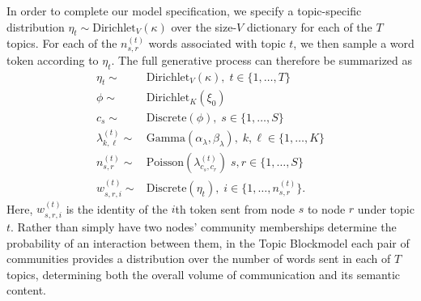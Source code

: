     In order to complete our model specification, we specify a topic-specific distribution $\eta_t \sim \mbox{Dirichlet}_V(\kappa)$ over the size-$V$ dictionary for each of the $T$ topics. For each of the $n_{s,r}^{(t)}$ words associated with topic $t$, we then sample a word token according to $\eta_t$. The full generative process can therefore be summarized as
    \begin{equation}
      \begin{aligned}
        \eta_t \sim& \mbox{Dirichlet}_V(\kappa),\; t\in \{1,\dots,T\}\\
        \phi \sim& \mbox{Dirichlet}_K(\xi_0)\\
        c_s \sim& \mbox{Discrete}(\phi),\; s\in\{1,\dots,S\}\\
        \lambda^{(t)}_{k,\ell}\sim& \mbox{Gamma}(\alpha_\lambda, \beta_\lambda),\; k,\ell \in\{1,\dots, K\}\\
        n_{s,r}^{(t)}\sim& \mbox{Poisson}(\lambda_{c_s,c_r}^{(t)})\; s,r \in\{1,\dots, S\}\\
        w_{s,r,i}^{(t)} \sim& \mbox{Discrete}(\eta_t),\; i\in\{1,\dots, n_{s,r}^{(t)}\}.
      \end{aligned}\label{eqn:PoisForm}
    \end{equation}
    Here, $w_{s,r,i}^{(t)}$ is the identity of the $i$th token sent from node $s$ to node $r$ under topic $t$. Rather than simply have two nodes' community memberships determine the probability of an interaction between them, in the Topic Blockmodel each pair of communities provides a distribution over the number of words sent in each of $T$ topics, determining both the overall volume of communication and its semantic content.
    
